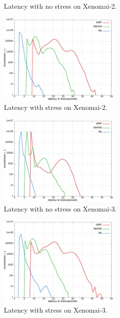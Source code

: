\documentclass[10pt,a4paper]{article}
\begin{document}
\begin{multicols}{2}
\begin{figure}[H]
\begin{center}
\caption{Latency with no stress on Xenomai-2.}
\label{x2-latency-idle}
\end{center}
\end{figure}
\begin{figure}[H]
\begin{center}
\includegraphics[width=6cm]{img/x2-cpu.png}
\caption{Latency with stress on Xenomai-2.}
\label{x2-latency-stress}
\end{center}
\end{figure}
\begin{figure}[H]
\begin{center}
\includegraphics[width=6cm]{img/x3-idle.png}
\caption{Latency with no stress on Xenomai-3.}
\label{x3-latency-idle}
\end{center}
\end{figure}
\begin{figure}[H]
\begin{center}
\includegraphics[width=6cm]{img/x3-cpu.png}
\caption{Latency with stress on Xenomai-3.}
\label{x3-latency-stress}
\end{center}
\end{figure} 

\end{multicols}
\end{document}
